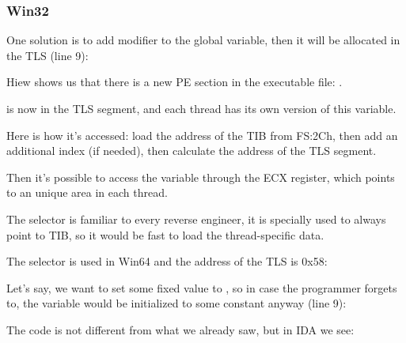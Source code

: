 \subsubsection{Win32}


One solution is to add  modifier to the global variable, 
then it will be allocated in the \ac{TLS} (line 9):



Hiew shows us that there is a new PE section in the executable file: .



 is now in the \ac{TLS} segment, and each thread has its own version of this variable.

Here is how it's accessed: load the address of the \ac{TIB} from FS:2Ch, then add an additional index (if needed),
then calculate the address of the \ac{TLS} segment.

Then it's possible to access the  variable through the ECX register, which points to an unique area in each thread.


The  selector is familiar to every reverse engineer, it is specially used to always point to \ac{TIB},
so it would be fast to load the thread-specific data.


The  selector is used in Win64 and the address of the \ac{TLS} is 0x58:




Let's say, we want to set some fixed value to , so in case the programmer forgets to,
the  variable would be initialized to some constant anyway (line 9):



The code is not different from what we already saw, but in IDA we see:



